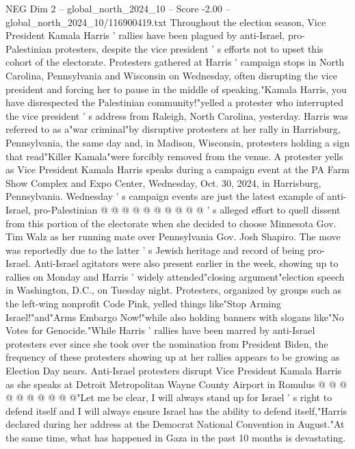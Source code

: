 \begin{textsample}{NEG Dim 2 – global\_north\_2024\_10 – Score -2.00 – global\_north\_2024\_10/116900419.txt}  \label{ex:f2_neg_099}
Throughout the election season, Vice President Kamala Harris ' rallies have been plagued by anti-Israel, pro-Palestinian protesters, despite the vice president ' s efforts not to upset this cohort of the electorate.
Protesters gathered at Harris ' campaign stops in North Carolina, Pennsylvania and Wisconsin on Wednesday, often disrupting the vice president and forcing her to pause in the middle of speaking."Kamala Harris, you have disrespected the Palestinian community!"yelled a protester who interrupted the vice president ' s address from Raleigh, North Carolina, yesterday.
Harris was referred to as a"war criminal"by disruptive protesters at her rally in Harrisburg, Pennsylvania, the same day and, in Madison, Wisconsin, protesters holding a sign that read"Killer Kamala"were forcibly removed from the venue.
A protester yells as Vice President Kamala Harris speaks during a campaign event at the PA Farm Show Complex and Expo Center, Wednesday, Oct. 30, 2024, in Harrisburg, Pennsylvania.
Wednesday ' s campaign events are just the latest example of anti-Israel, pro-Palestinian @ @ @ @ @ @ @ @ @ @ ' s alleged effort to quell dissent from this portion of the electorate when she decided to choose Minnesota Gov.
Tim Walz as her running mate over Pennsylvania Gov.
Josh Shapiro.
The move was reportedly due to the latter ' s Jewish heritage and record of being pro-Israel.
Anti-Israel agitators were also present earlier in the week, showing up to rallies on Monday and Harris ' widely attended"closing argument"election speech in Washington, D.C., on Tuesday night.
Protesters, organized by groups such as the left-wing nonprofit Code Pink, yelled things like"Stop Arming Israel!"and"Arms Embargo Now!"while also holding banners with slogans like"No Votes for Genocide."While Harris ' rallies have been marred by anti-Israel protesters ever since she took over the nomination from President Biden, the frequency of these protesters showing up at her rallies appears to be growing as Election Day nears.
Anti-Israel protesters disrupt Vice President Kamala Harris as she speaks at Detroit Metropolitan Wayne County Airport in Romulus @ @ @ @ @ @ @ @ @ @"Let me be clear, I will always stand up for Israel ' s right to defend itself and I will always ensure Israel has the ability to defend itself,"Harris declared during her address at the Democrat National Convention in August."At the same time, what has happened in Gaza in the past 10 months is devastating.

\end{textsample}
